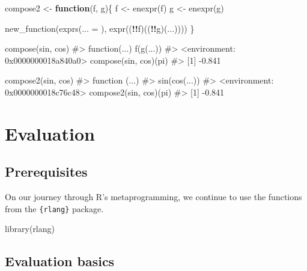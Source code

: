 \documentclass[
]{krantz}
\makeatletter
\newenvironment{Shaded}{\begin{snugshade}}{\end{snugshade}}
\newcommand{\CommentTok}[1]{\textcolor[rgb]{0.56,0.35,0.01}{\textit{#1}}}
\newcommand{\ControlFlowTok}[1]{\textcolor[rgb]{0.13,0.29,0.53}{\textbf{#1}}}
\newcommand{\DataTypeTok}[1]{\textcolor[rgb]{0.13,0.29,0.53}{#1}}
\newcommand{\KeywordTok}[1]{\textcolor[rgb]{0.13,0.29,0.53}{\textbf{#1}}}
\newcommand{\NormalTok}[1]{#1}
\newcommand{\OperatorTok}[1]{\textcolor[rgb]{0.81,0.36,0.00}{\textbf{#1}}}
\newcommand{\StringTok}[1]{\textcolor[rgb]{0.31,0.60,0.02}{#1}}
\newenvironment{kframe}{%
\medskip{}
\setlength{\fboxsep}{.8em}
 \def\at@end@of@kframe{}%
 \ifinner\ifhmode%
  \def\at@end@of@kframe{\end{minipage}}%
  \begin{minipage}{\columnwidth}%
 \fi\fi%
 \def\FrameCommand##1{\hskip\@totalleftmargin \hskip-\fboxsep
 \colorbox{shadecolor}{##1}\hskip-\fboxsep
     \hskip-\linewidth \hskip-\@totalleftmargin \hskip\columnwidth}%
 \MakeFramed {\advance\hsize-\width
   \@totalleftmargin\z@ \linewidth\hsize
   \@setminipage}}%
 {\par\unskip\endMakeFramed%
 \at@end@of@kframe}
\renewenvironment{Shaded}{\begin{kframe}}{\end{kframe}}
\renewcommand{\KeywordTok} [1]{\textcolor[rgb]{0.00,0.44,0.13}{{#1}}}
\renewcommand{\DataTypeTok}[1]{\textcolor[rgb]{0.56,0.13,0.00}{{#1}}}
\renewcommand{\StringTok}  [1]{\textcolor[rgb]{0.25,0.44,0.63}{{#1}}}
\renewcommand{\CommentTok} [1]{\textcolor[rgb]{0.38,0.63,0.69}{{#1}}}
\renewcommand{\NormalTok}  [1]{{#1}}
\makeatother
\begin{document}
\begin{Shaded}
\begin{Highlighting}[]
\NormalTok{compose2 <-}\StringTok{ }\ControlFlowTok{function}\NormalTok{(f, g)\{}
\NormalTok{  f <-}\StringTok{ }\KeywordTok{enexpr}\NormalTok{(f)}
\NormalTok{  g <-}\StringTok{ }\KeywordTok{enexpr}\NormalTok{(g)}
  
  \KeywordTok{new_function}\NormalTok{(}\KeywordTok{exprs}\NormalTok{(}\DataTypeTok{... =}\NormalTok{ ), }\KeywordTok{expr}\NormalTok{((}\OperatorTok{!!}\NormalTok{f)((}\OperatorTok{!!}\NormalTok{g)(...))))}
\NormalTok{\}}

\KeywordTok{compose}\NormalTok{(sin, cos)}
\CommentTok{#> function(...) f(g(...))}
\CommentTok{#> <environment: 0x0000000018a840a0>}
\KeywordTok{compose}\NormalTok{(sin, cos)(pi)}
\CommentTok{#> [1] -0.841}

\KeywordTok{compose2}\NormalTok{(sin, cos)}
\CommentTok{#> function (...) }
\CommentTok{#> sin(cos(...))}
\CommentTok{#> <environment: 0x0000000018c76c48>}
\KeywordTok{compose2}\NormalTok{(sin, cos)(pi)}
\CommentTok{#> [1] -0.841}
\end{Highlighting}
\end{Shaded}

\hypertarget{evaluation}{%
\chapter{Evaluation}\label{evaluation}}

\hypertarget{prerequisites-11}{%
\section*{Prerequisites}\label{prerequisites-11}}


On our journey through R's metaprogramming, we continue to use the functions from the \texttt{\{rlang\}} package.

\begin{Shaded}
\begin{Highlighting}[]
\KeywordTok{library}\NormalTok{(rlang)}
\end{Highlighting}
\end{Shaded}


\hypertarget{evaluation-basics}{%
\section{Evaluation basics}\label{evaluation-basics}}
\end{document}
